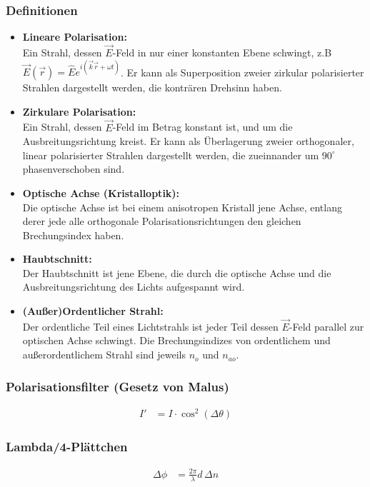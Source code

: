 \documentclass[twocolumn, unnumberedsubsub]{summery_5.0} %
\begin{document}
\subsubsection{Definitionen}
\begin{itemize}
    \item {\bf Lineare Polarisation:}\\
    Ein Strahl, dessen \(\vec E\)-Feld in nur einer konstanten Ebene schwingt, z.B 
    $\vec E(\vec r) = \hat E e^{i(\vec k \vec r + \omega t)}$. Er kann als Superposition zweier zirkular polarisierter Strahlen dargestellt werden, 
    die konträren Drehsinn haben.
    \item {\bf Zirkulare Polarisation:}\\
    Ein Strahl, dessen \(\vec E\)-Feld im Betrag konstant ist, und um die Ausbreitungsrichtung
    kreist. Er kann als Überlagerung zweier orthogonaler, linear polarisierter
    Strahlen dargestellt werden, die zueinnander um \(90^\circ\) phasenverschoben sind.
    \item {\bf Optische Achse (Kristalloptik):}\\
    Die optische Achse ist bei einem anisotropen Kristall jene Achse, entlang derer 
    jede alle orthogonale Polarisationsrichtungen den gleichen Brechungsindex haben.
    \item {\bf Haubtschnitt:}\\
    Der Haubtschnitt ist jene Ebene, die durch die optische Achse und die Ausbreitungsrichtung 
    des Lichts aufgespannt wird.
    \item {\bf (Au{\ss}er)Ordentlicher Strahl:}\\
    Der ordentliche Teil eines Lichtstrahls ist jeder Teil dessen \(\vec E\)-Feld parallel zur optischen Achse schwingt. Die Brechungsindizes von ordentlichem und au{\ss}erordentlichem Strahl sind 
    jeweils \(n_o\) und \(n_{ao}\).
\end{itemize}

\subsubsection{Polarisationsfilter (Gesetz von Malus)}
\begin{align*}
    I' &= I \cdot \cos^2(\Delta \theta)
\end{align*}
\subsubsection{Lambda/4-Plättchen}
\begin{align*}
\Delta \phi &=\frac{2\pi}{\lambda} d \,\Delta n
\end{align*}
\end{document}
